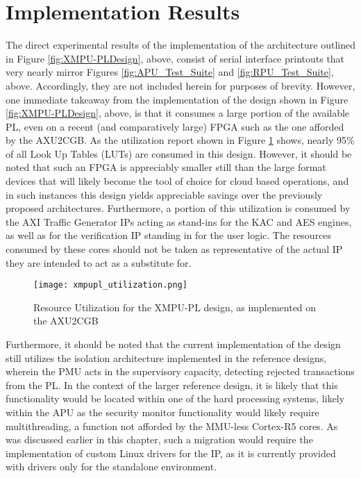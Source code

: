 \section{Implementation Results}\label{sec:DMAResults}

The direct experimental results of the implementation of the architecture outlined in Figure \ref{fig:XMPU-PLDesign}, above, consist of serial interface printouts that very nearly mirror Figures \ref{fig:APU_Test_Suite} and \ref{fig:RPU_Test_Suite}, above. Accordingly, they are not included herein for purposes of brevity. However, one immediate takeaway from the implementation of the design shown in Figure \ref{fig:XMPU-PLDesign}, above, is that it consumes a large portion of the available PL, even on a recent (and comparatively large) FPGA such as the one afforded by the AXU2CGB. As the utilization report shown in Figure \ref{fig:XMPU-PLUtilization} shows, nearly 95\% of all Look Up Tables (LUTs) are consumed in this design. However, it should be noted that such an FPGA is appreciably smaller still than the large format devices that will likely become the tool of choice for cloud based operations, and in such instances this design yields appreciable savings over the previously proposed architectures. Furthermore, a portion of this utilization is consumed by the AXI Traffic Generator IPs acting as stand-ins for the KAC and AES engines, as well as for the verification IP standing in for the user logic. The resources consumed by these cores should not be taken as representative of the actual IP they are intended to act as a substitute for.

\begin{figure}
    \centering
    \texttt{[image: xmpupl\_utilization.png]}
    \caption[Memory Isolation Resource Utilization]{Resource Utilization for the XMPU-PL design, as implemented on the AXU2CGB}
    \label{fig:XMPU-PLUtilization}
\end{figure}

Furthermore, it should be noted that the current implementation of the design still utilizes the isolation architecture implemented in the reference designs, wherein the PMU acts in the supervisory capacity, detecting rejected transactions from the PL. In the context of the larger reference design, it is likely that this functionality would be located within one of the hard processing systems, likely within the APU as the security monitor functionality would likely require multithreading, a function not afforded by the MMU-less Cortex-R5 cores. As was discussed earlier in this chapter, such a migration would require the implementation of custom Linux drivers for the IP, as it is currently provided with drivers only for the standalone environment.